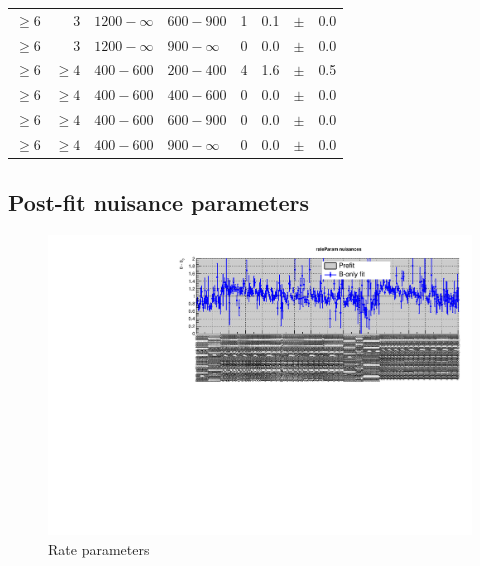 \begin{table}[!h]
\begin{tabular}{rrllrrcl}
$\geq 6$ & 3 & $1200- \infty$ & $600-900$ &      1 &      0.1 &$\pm$&    0.0 \\
$\geq 6$ & 3 & $1200- \infty$ & $900-\infty$ &      0 &      0.0 &$\pm$&    0.0 \\
$\geq 6$ & $\geq 4$ & $ 400- 600$ & $200-400$ &      4 &      1.6 &$\pm$&    0.5 \\
$\geq 6$ & $\geq 4$ & $ 400- 600$ & $400-600$ &      0 &      0.0 &$\pm$&    0.0 \\
$\geq 6$ & $\geq 4$ & $ 400- 600$ & $600-900$ &      0 &      0.0 &$\pm$&    0.0 \\
$\geq 6$ & $\geq 4$ & $ 400- 600$ & $900-\infty$ &      0 &      0.0 &$\pm$&    0.0 \\
    \hline
  \end{tabular}
\end{table}

%
%

\clearpage
\subsection{Post-fit nuisance parameters}
\label{app:nuispost}

\begin{figure}[h!]
  \centering
  \caption{Rate parameters}
  \includegraphics[width=1.\linewidth]{figures/results/36invfb_preapproval/postfit/nuis/Rates_nuisances}
\end{figure}

